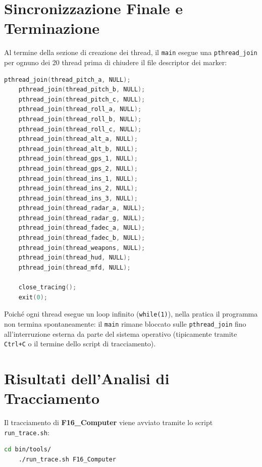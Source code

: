 
\section{Sincronizzazione Finale e Terminazione}
Al termine della sezione di creazione dei thread, il \texttt{main} esegue una \texttt{pthread\_join} per ognuno dei 20 thread prima di chiudere il file descriptor dei marker:

\begin{lstlisting}[language=C++, caption={Attesa di terminazione di tutti i 20 thread}]
	pthread_join(thread_pitch_a, NULL);
	pthread_join(thread_pitch_b, NULL);
	pthread_join(thread_pitch_c, NULL);
	pthread_join(thread_roll_a, NULL);
	pthread_join(thread_roll_b, NULL);
	pthread_join(thread_roll_c, NULL);
	pthread_join(thread_alt_a, NULL);
	pthread_join(thread_alt_b, NULL);
	pthread_join(thread_gps_1, NULL);
	pthread_join(thread_gps_2, NULL);
	pthread_join(thread_ins_1, NULL);
	pthread_join(thread_ins_2, NULL);
	pthread_join(thread_ins_3, NULL);
	pthread_join(thread_radar_a, NULL);
	pthread_join(thread_radar_g, NULL);
	pthread_join(thread_fadec_a, NULL);
	pthread_join(thread_fadec_b, NULL);
	pthread_join(thread_weapons, NULL);
	pthread_join(thread_hud, NULL);
	pthread_join(thread_mfd, NULL);
	
	close_tracing();
	exit(0);
\end{lstlisting}

Poiché ogni thread esegue un loop infinito (\texttt{while(1)}), nella pratica il programma non termina spontaneamente: il \texttt{main} rimane bloccato sulle \texttt{pthread\_join} fino all'interruzione esterna da parte del sistema operativo (tipicamente tramite \texttt{Ctrl+C} o il termine dello script di tracciamento).
\clearpage

\section{Risultati dell'Analisi di Tracciamento}
Il tracciamento di \textbf{F16\_Computer} viene avviato tramite lo script \texttt{run\_trace.sh}:

\begin{lstlisting}[language=bash]
	cd bin/tools/
	./run_trace.sh F16_Computer
\end{lstlisting}

